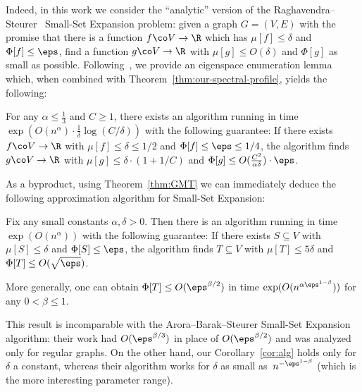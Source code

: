 \documentclass[11pt]{article}
\newcommand{\Bdry}{\Phi}
\newcommand{\Spars}{\mu}
\begin{document}
{Indeed, in this work we consider the ``analytic'' version of the Raghavendra--Steurer~\cite{RS10} Small-Set Expansion problem: given a graph $G = (V,E)$ with the promise that there is a function $f \co V \to \R$ which has $\mu[f] \leq \delta$ and $\Bdry[f] \leq \eps$, find a function $g \co V \to \R$ with $\mu[g] \leq O(\delta)$ and $\Bdry[g]$ as small as possible.  Following~\cite{ABS10}, we provide an eigenspace enumeration lemma which, when combined with Theorem~\ref{thm:our-spectral-profile}, yields the following:
\begin{theorem} \label{thm:our-alg}
    For any $\alpha \leq \frac13$ and $C \geq 1$, there exists an algorithm running in time $\exp(O(n^\alpha) \cdot\tfrac{1}{\delta}\log(C/\delta))$ with the following guarantee:  If there exists $f \co V \to \R$ with $\Spars[f] \leq \delta \leq 1/2$ and $\Bdry[f] \leq \eps \leq 1/4$, the algorithm finds $g \co V \to \R$ with $\Spars[g] \leq \delta \cdot(1+1/C)$ and $\Bdry[g] \leq O(\frac{C^2}{\alpha \delta}) \cdot \eps$.
\end{theorem}

As a byproduct, using Theorem~\ref{thm:GMT} we can immediately deduce the following approximation algorithm for Small-Set Expansion:
\begin{corollary} \label{cor:alg}
    Fix any small constants $\alpha, \delta > 0$.  Then there is an algorithm running in time $\exp(O(n^\alpha))$ with the following guarantee:  If there exists $S \subseteq V$ with $\Spars[S] \leq \delta$ and $\Bdry[S] \leq \eps$, the algorithm finds $T \subseteq V$ with $\Spars[T] \leq 5\delta$ and $\Bdry[T] \leq O(\sqrt{\eps})$.

    More generally, one can obtain $\Bdry[T] \leq O(\eps^{\beta/2})$ in time $\exp(O(n^{\alpha \eps^{1-\beta}}))$ for any $0 < \beta \leq 1$.
\end{corollary}

This result is incomparable with the Arora--Barak--Steurer Small-Set Expansion algorithm: their work had $O(\eps^{\beta/3})$ in place of $O(\eps^{\beta/2})$ and was analyzed only for regular graphs. On the other hand, our Corollary~\ref{cor:alg} holds only for $\delta$ a constant, whereas their algorithm works for $\delta$ as small as~$n^{-\eps^{1-\beta}}$ (which is the more interesting parameter range).

}
\end{document}
